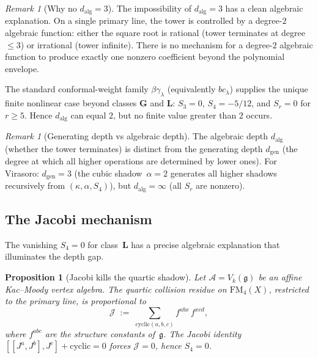 \documentclass[11pt,reqno]{amsart}
\newtheorem{proposition}[theorem]{Proposition}
\theoremstyle{definition}
\theoremstyle{remark}
\newtheorem{remark}[theorem]{Remark}
\newcommand{\cA}{\mathcal{A}}
\newcommand{\FM}{\mathrm{FM}}
\newcommand{\fg}{\mathfrak{g}}
\numberwithin{equation}{section}
\begin{document}
\begin{remark}[Why no $d_{\mathrm{alg}} = 3$]
\label{rem:why-no-3}
The impossibility of $d_{\mathrm{alg}} = 3$ has a clean
algebraic explanation. On a single primary line, the tower
is controlled by a degree-$2$ algebraic function: either
the square root is rational (tower terminates at
degree~$\le 3$) or irrational (tower infinite). There is
no mechanism for a degree-$2$ algebraic function to produce
exactly one nonzero coefficient beyond the polynomial
envelope.

The standard conformal-weight family
$\beta\gamma_\lambda$ (equivalently $bc_\lambda$) supplies the
unique finite nonlinear case beyond classes $\mathbf{G}$ and
$\mathbf{L}$:
$S_3 = 0$, $S_4 = -5/12$, and $S_r = 0$ for $r \ge 5$.
Hence $d_{\mathrm{alg}}$ can equal $2$, but no finite value
greater than $2$ occurs.
\end{remark}

\begin{remark}[Generating depth vs algebraic
depth]\label{rem:gen-vs-alg}
The algebraic depth $d_{\mathrm{alg}}$ (whether the tower
terminates) is distinct from the generating depth
$d_{\mathrm{gen}}$ (the degree at which all higher
operations are determined by lower ones).
For Virasoro: $d_{\mathrm{gen}} = 3$ (the cubic
shadow~$\alpha = 2$ generates all higher shadows recursively
from $(\kappa, \alpha, S_4)$), but
$d_{\mathrm{alg}} = \infty$ (all $S_r$ are nonzero).
\end{remark}

\subsection{The Jacobi mechanism}\label{subsec:jacobi}

The vanishing $S_4 = 0$ for class~$\mathbf{L}$ has a
precise algebraic explanation that illuminates the
depth gap.

\begin{proposition}[Jacobi kills the quartic
shadow]\label{prop:jacobi-kills-s4}
Let $\cA = V_k(\fg)$ be an affine Kac--Moody vertex
algebra. The quartic collision residue on $\FM_4(X)$,
restricted to the primary line, is proportional to
\[
 \mathcal{J}
 \;:=\;
 \sum_{\mathrm{cyclic}(a,b,c)}
 f^{abx}\, f^{xcd},
\]
where $f^{abc}$ are the structure constants of~$\fg$.
The Jacobi identity
$[[J^a, J^b], J^c] + \mathrm{cyclic} = 0$
forces $\mathcal{J} = 0$, hence $S_4 = 0$.
\end{proposition}
\end{document}
